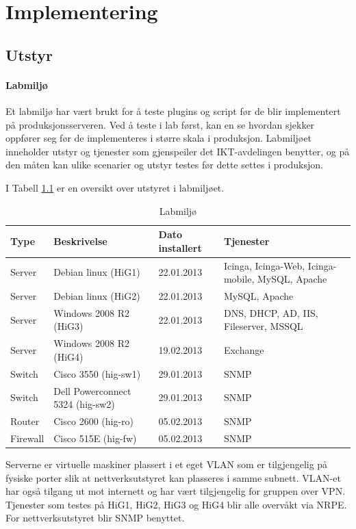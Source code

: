\chapter{Implementering}
\section{Utstyr}
\subsubsection{Labmiljø}
Et labmiljø har vært brukt for å teste plugins og script før de blir implementert på produksjonsserveren. Ved å teste i lab først, kan en se hvordan sjekker oppfører seg før de implementeres i større skala i produksjon. Labmiljøet inneholder utstyr og tjenester som gjenspeiler det IKT-avdelingen benytter, og på den måten kan ulike scenarier og utstyr testes før dette settes i produksjon.

I Tabell \ref{labmiljo} er en oversikt over utstyret i labmiljøet.
\begin{changemargin}{-1cm}{-1cm}
\begin{table}
\begin{center}
\begin{tabular}{ | l | l | l | p{4cm} |} \hline
	\textbf{Type} & \textbf{Beskrivelse} & \textbf{Dato installert} & \textbf{Tjenester} \\ \hline
	Server & Debian linux (HiG1) & 22.01.2013 & Icinga, Icinga-Web, Icinga-mobile, MySQL, Apache \\ \hline
	Server & Debian linux (HiG2) & 22.01.2013 &	MySQL, Apache \\ \hline
	Server & Windows 2008 R2 (HiG3) & 22.01.2013 & DNS, DHCP, AD, IIS, Fileserver, MSSQL \\ \hline
	Server & Windows 2008 R2 (HiG4) & 19.02.2013 & Exchange \\ \hline 
	Switch & Cisco 3550 (hig-sw1) &	29.01.2013 & SNMP \\ \hline
	Switch & Dell Powerconnect 5324 (hig-sw2) & 29.01.2013 & SNMP \\ \hline
	Router & Cisco 2600 (hig-ro) & 05.02.2013 & SNMP \\ \hline 
	Firewall & Cisco 515E (hig-fw) & 05.02.2013 & SNMP \\ \hline
\end{tabular}
\caption{Labmiljø}
\label{labmiljo}
\end{center}
\end{table}
\end{changemargin}
Serverne er virtuelle maskiner plassert i et eget VLAN som er tilgjengelig på fysiske porter slik at nettverksutstyret kan plasseres i samme subnett. VLAN-et har også tilgang ut mot internett og har vært tilgjengelig for gruppen over VPN. Tjenester som testes på HiG1, HiG2, HiG3 og HiG4 blir alle overvåkt via NRPE. For nettverksutstyret blir SNMP benyttet.

